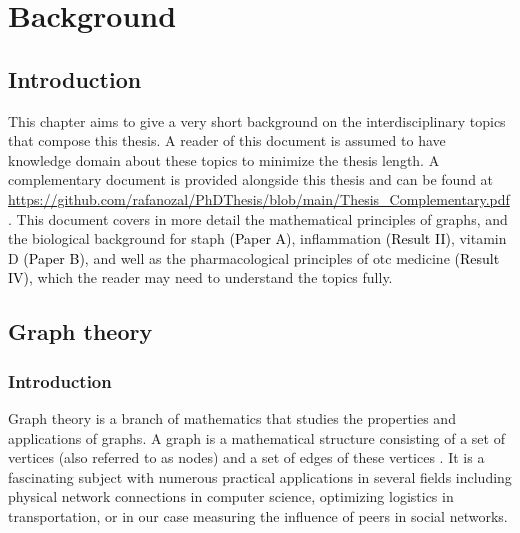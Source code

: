 \chapter{Background}\label{ch:background}




\section{Introduction}

This chapter aims to give a very short background on the interdisciplinary topics that compose this thesis. A reader of this document is assumed to have knowledge domain about these topics to minimize the thesis length. A complementary document is provided alongside this thesis and can be found at \url{https://github.com/rafanozal/PhDThesis/blob/main/Thesis_Complementary.pdf}. This document covers in more detail the mathematical principles of graphs, and the biological background for \gls{staph} \colorbox{PaperColor}{\textcolor{black}{(Paper A)}}, inflammation \colorbox{ResultColor}{\textcolor{black}{(Result II)}}, vitamin D \colorbox{PaperColor}{\textcolor{black}{(Paper B)}}, and well as the pharmacological principles of \gls{otc} medicine \colorbox{ResultColor}{\textcolor{black}{(Result IV)}},  which the reader may need to understand the topics fully.




\section{Graph theory}

\subsection{Introduction}

Graph theory is a branch of mathematics that studies the properties and applications of graphs. A graph is a mathematical structure consisting of a set of vertices (also referred to as nodes) and a set of edges of these vertices \cite{Trudeau1994-op}. It is a fascinating subject with numerous practical applications in several fields including physical network connections in computer science, optimizing logistics in transportation, or in our case measuring the influence of peers in social networks.

